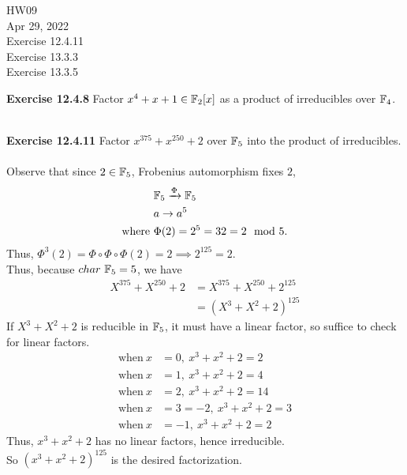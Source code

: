 \documentclass{article}
\begin{document}
\maketitle
HW09 \\
Apr 29, 2022 \\
Exercise 12.4.11\\
Exercise 13.3.3\\
Exercise 13.3.5\\

\begin{homeworkProblem}
\textbf{Exercise 12.4.8} Factor $x^4 + x + 1 \in \mathbb{F}_2[x]$ as a product of irreducibles over $\mathbb{F}_4$.\\
\solution \\

\end{homeworkProblem}

\pagebreak

\begin{homeworkProblem}
\textbf{Exercise 12.4.11} Factor $x^{375} + x^{250} + 2 $ over $ \mathbb{F}_5$ into the product of irreducibles. \\
\solution \\
Observe that since $2 \in \mathbb{F}_5$, Frobenius automorphism fixes $2$,
\begin{align}
    & \mathbb{F}_5 \xrightarrow{\Phi} \mathbb{F}_5\\
    & a \rightarrow a^5 \\
    \text{where} \ &\Phi(2) = 2^5 = 32 = 2 \mod 5.
\end{align}
Thus, $\Phi^3(2) = \Phi \circ \Phi \circ \Phi (2) = 2 \implies 2^{125} = 2$.\\
Thus, because $char \ \mathbb{F}_5 = 5$, we have 
\begin{align}
    X^{375} + X^{250} + 2 &= X^{375} + X^{250} + 2^{125}\\
    &= (X^3 + X^2 + 2)^{125}
\end{align}
If $X^3 + X^2 + 2$ is reducible in $\mathbb{F}_5$, it must have a linear factor, so suffice to check for linear factors.\\
\begin{align}
    \text{when} \ x &= 0, \ x^3 + x^2 + 2 = 2\\
    \text{when} \ x &= 1, \ x^3 + x^2 + 2 = 4\\
    \text{when} \ x &= 2, \ x^3 + x^2 + 2 = 14\\
    \text{when} \ x &= 3 = -2, \ x^3 + x^2 + 2 = 3\\
    \text{when} \ x &= -1, \ x^3 + x^2 + 2 = 2
\end{align}
Thus, $x^3 + x^2 + 2$ has no linear factors, hence irreducible.\\
So $(x^3 + x^2 + 2)^{125}$ is the desired factorization.



\end{homeworkProblem}
\end{document}
